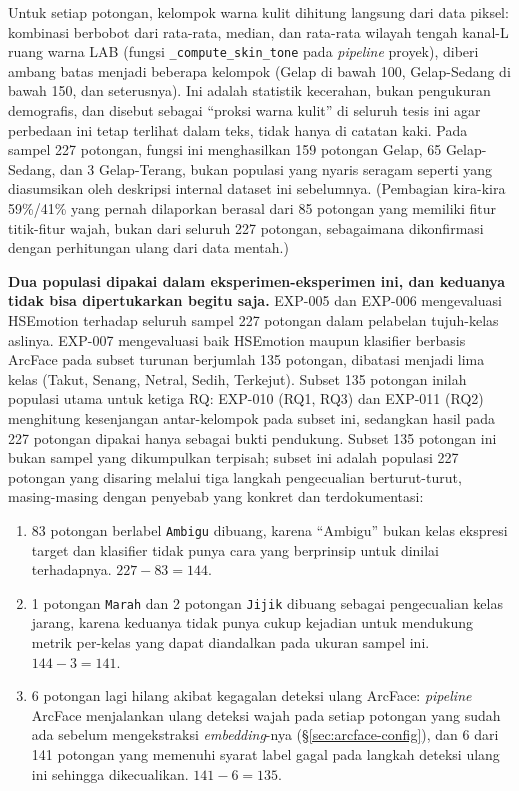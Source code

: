 Untuk setiap potongan, kelompok warna kulit dihitung langsung dari data piksel: kombinasi berbobot dari rata-rata, median, dan rata-rata wilayah tengah kanal-L ruang warna LAB (fungsi \texttt{\_compute\_skin\_tone} pada \textit{pipeline} proyek), diberi ambang batas menjadi beberapa kelompok (Gelap di bawah 100, Gelap-Sedang di bawah 150, dan seterusnya). Ini adalah statistik kecerahan, bukan pengukuran demografis, dan disebut sebagai ``proksi warna kulit'' di seluruh tesis ini agar perbedaan ini tetap terlihat dalam teks, tidak hanya di catatan kaki. Pada sampel 227 potongan, fungsi ini menghasilkan 159 potongan Gelap, 65 Gelap-Sedang, dan 3 Gelap-Terang, bukan populasi yang nyaris seragam seperti yang diasumsikan oleh deskripsi internal dataset ini sebelumnya. (Pembagian kira-kira 59\%/41\% yang pernah dilaporkan berasal dari 85 potongan yang memiliki fitur titik-fitur wajah, bukan dari seluruh 227 potongan, sebagaimana dikonfirmasi dengan perhitungan ulang dari data mentah.)

\textbf{Dua populasi dipakai dalam eksperimen-eksperimen ini, dan keduanya tidak bisa dipertukarkan begitu saja.} EXP-005 dan EXP-006 mengevaluasi HSEmotion terhadap seluruh sampel 227 potongan dalam pelabelan tujuh-kelas aslinya. EXP-007 mengevaluasi baik HSEmotion maupun klasifier berbasis ArcFace pada subset turunan berjumlah 135 potongan, dibatasi menjadi lima kelas (Takut, Senang, Netral, Sedih, Terkejut). Subset 135 potongan inilah populasi utama untuk ketiga RQ: EXP-010 (RQ1, RQ3) dan EXP-011 (RQ2) menghitung kesenjangan antar-kelompok pada subset ini, sedangkan hasil pada 227 potongan dipakai hanya sebagai bukti pendukung. Subset 135 potongan ini bukan sampel yang dikumpulkan terpisah; subset ini adalah populasi 227 potongan yang disaring melalui tiga langkah pengecualian berturut-turut, masing-masing dengan penyebab yang konkret dan terdokumentasi:

\begin{enumerate}
  \item 83 potongan berlabel \texttt{Ambigu} dibuang, karena ``Ambigu'' bukan kelas ekspresi target dan klasifier tidak punya cara yang berprinsip untuk dinilai terhadapnya. $227 - 83 = 144$.
  \item 1 potongan \texttt{Marah} dan 2 potongan \texttt{Jijik} dibuang sebagai pengecualian kelas jarang, karena keduanya tidak punya cukup kejadian untuk mendukung metrik per-kelas yang dapat diandalkan pada ukuran sampel ini. $144 - 3 = 141$.
  \item 6 potongan lagi hilang akibat kegagalan deteksi ulang ArcFace: \textit{pipeline} ArcFace menjalankan ulang deteksi wajah pada setiap potongan yang sudah ada sebelum mengekstraksi \textit{embedding}-nya (\S\ref{sec:arcface-config}), dan 6 dari 141 potongan yang memenuhi syarat label gagal pada langkah deteksi ulang ini sehingga dikecualikan. $141 - 6 = 135$.
\end{enumerate}

